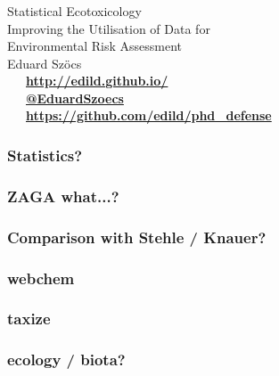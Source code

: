 \documentclass[10pt
	]{beamer}
\begin{document}
\begin{frame}[standout]
	\frametitle{}

	\vspace{1em}
	\Huge{Statistical Ecotoxicology} \\[0.3em]
	\large{Improving the Utilisation of Data for \\ Environmental Risk Assessment} \\[1em]

	\normalsize
	Eduard Szöcs \\[3em]

	\faLaptop~~~\textbf{\href{http://edild.github.io/}{http://edild.github.io/ }}\\[.5em]
	\faTwitter~~~\textbf{\href{http://twitter.com/EduardSzoecs}{@EduardSzoecs}} 	\\[0.5em]
	\faGift~~~\textbf{\href{https://github.com/edild/talk_work2}{https://github.com/edild/phd\_defense}}\\[4em]

	\begin{center}\ccbysa\end{center} 

\end{frame}


\appendix

\begin{frame}
\frametitle{Statistics?}

\end{frame}


\begin{frame}
\frametitle{ZAGA what...?}

\end{frame}


\begin{frame}
\frametitle{Comparison with Stehle / Knauer?}

\end{frame}


\begin{frame}
\frametitle{webchem}

\end{frame}


\begin{frame}
\frametitle{taxize}

\end{frame}


\begin{frame}
\frametitle{ecology / biota?}

\end{frame}


\end{document}
